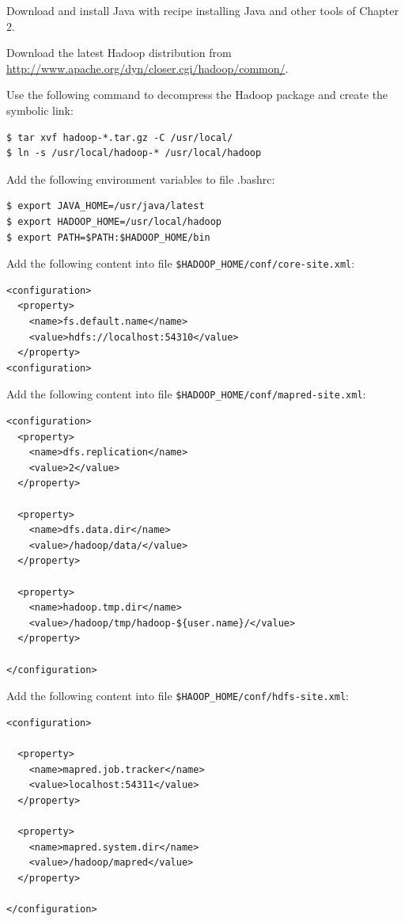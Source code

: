Download and install Java with recipe installing Java and other tools of Chapter 2.

Download the latest Hadoop distribution from \url{http://www.apache.org/dyn/closer.cgi/hadoop/common/}.

Use the following command to decompress the Hadoop package and create the symbolic link:
\lstset{style=bashstyle}
\begin{lstlisting}
$ tar xvf hadoop-*.tar.gz -C /usr/local/
$ ln -s /usr/local/hadoop-* /usr/local/hadoop
\end{lstlisting}

Add the following environment variables to file .bashrc: 
\lstset{style=bashstyle}
\begin{lstlisting}
$ export JAVA_HOME=/usr/java/latest
$ export HADOOP_HOME=/usr/local/hadoop
$ export PATH=$PATH:$HADOOP_HOME/bin
\end{lstlisting}

Add the following content into file \verb|$HADOOP_HOME/conf/core-site.xml|:
\lstset{style=bashstyle}
\begin{lstlisting}
<configuration>
  <property>
    <name>fs.default.name</name>
    <value>hdfs://localhost:54310</value>
  </property>
<configuration>
\end{lstlisting}

Add the following content into file \verb|$HADOOP_HOME/conf/mapred-site.xml|:
\lstset{style=bashstyle}
\begin{lstlisting}
<configuration>
  <property>
    <name>dfs.replication</name>
    <value>2</value>
  </property>

  <property>
    <name>dfs.data.dir</name>
    <value>/hadoop/data/</value>
  </property>

  <property>
    <name>hadoop.tmp.dir</name>
    <value>/hadoop/tmp/hadoop-${user.name}/</value>
  </property>

</configuration>
\end{lstlisting}

Add the following content into file \verb|$HAOOP_HOME/conf/hdfs-site.xml|:
\lstset{style=bashstyle}
\begin{lstlisting}
<configuration>

  <property>
    <name>mapred.job.tracker</name>
    <value>localhost:54311</value>
  </property>

  <property>
    <name>mapred.system.dir</name>
    <value>/hadoop/mapred</value>
  </property>

</configuration>
\end{lstlisting}

